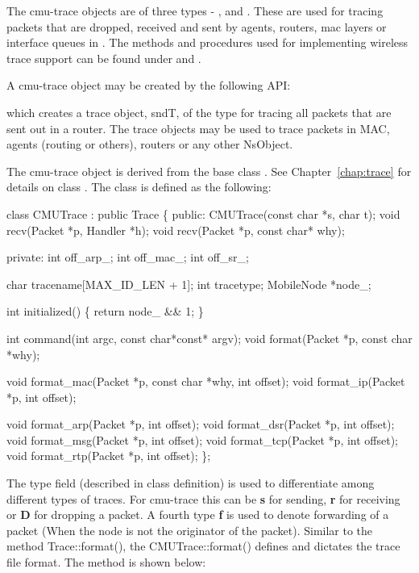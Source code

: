 The cmu-trace objects are of three types - ,
 and . These are used for tracing
packets that are dropped, received and sent by agents, routers, mac layers
or interface queues in \ns. The methods and procedures used for
implementing wireless trace support can be found under
 and .

A cmu-trace object may be created by the following API:

which creates a trace object, sndT, of the type  for tracing all packets that are sent out in a router. The trace objects may be used to trace packets in MAC, agents (routing or others), routers or any other NsObject. 

The cmu-trace object  is derived from the base class . See Chapter~\ref{chap:trace} for details on class . The class  is defined as the following:

\begin{program}
class CMUTrace : public Trace \{
public:
	CMUTrace(const char *s, char t);
	void	recv(Packet *p, Handler *h);
	void	recv(Packet *p, const char* why);

private:
	int off_arp_;
	int off_mac_;
	int off_sr_;

	char	tracename[MAX_ID_LEN + 1];
        int     tracetype;
        MobileNode *node_;

        int initialized() \{ return node_ && 1; \}

	int	command(int argc, const char*const* argv);
	void	format(Packet *p, const char *why);

	void	format_mac(Packet *p, const char *why, int offset);
	void	format_ip(Packet *p, int offset);

	void	format_arp(Packet *p, int offset);
	void	format_dsr(Packet *p, int offset);
	void	format_msg(Packet *p, int offset);
	void	format_tcp(Packet *p, int offset);
	void	format_rtp(Packet *p, int offset);
\};
\end{program}

The type field (described in  class definition) is used to
differentiate among different types of traces. For cmu-trace this can be
{\bf s} for sending, {\bf r} for receiving or {\bf D} for dropping a
packet. A fourth type {\bf f} is used to denote forwarding of a packet
(When the node is not the originator of the packet). 
Similar to the method Trace::format(), the CMUTrace::format() defines and
dictates the trace file format. The method is shown below: 

